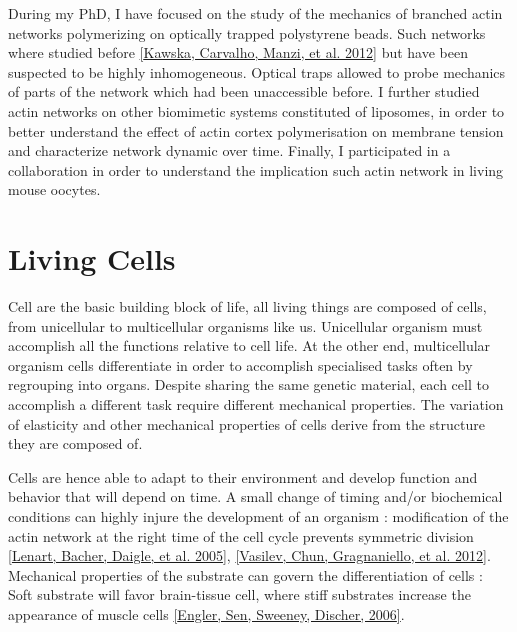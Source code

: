\documentclass[A4paperpaper,11pt,english]{sphinxmanual}
\begin{document}
During my PhD,  I have focused on the study of the mechanics of branched actin
networks polymerizing on optically trapped polystyrene beads. Such networks where
studied before {\hyperref[parts/part1:kawska2012]{{[}Kawska, Carvalho, Manzi,  et al.  2012{]}}} but have been suspected to be highly
inhomogeneous. Optical traps allowed to probe mechanics of parts of
the network which had been  unaccessible before.
I further studied actin
networks on other biomimetic systems constituted of liposomes, in order to better
understand the effect of actin cortex polymerisation on membrane tension and
characterize network dynamic over time. Finally,  I participated in a
collaboration in order to understand the implication such actin network in
living mouse oocytes.


\section{Living Cells}
\label{parts/part1:living-cells}
Cell are the basic building block of life, all living things are composed of
cells, from unicellular to multicellular organisms like us. Unicellular
organism must accomplish all the functions relative to cell life. At the other end,
multicellular organism cells differentiate in order to accomplish specialised
tasks often by regrouping into organs. Despite sharing the same genetic
material, each cell to accomplish a different task require different
mechanical properties. The variation of elasticity and other
mechanical properties of cells derive from the structure they are composed of.

Cells are hence able to adapt to their environment and develop function and
behavior that will depend on time. A small change of timing and/or biochemical
conditions can highly injure the development of an organism : modification of
the actin network at the right time of the cell cycle prevents symmetric division
{\hyperref[parts/part1:lenart2005]{{[}Lenart, Bacher, Daigle,  et al.  2005{]}}}, {\hyperref[parts/part1:vasilev2012]{{[}Vasilev, Chun, Gragnaniello,  et al.  2012{]}}}. Mechanical properties of the substrate can
govern the differentiation of cells : Soft substrate will favor brain-tissue
cell, where stiff substrates increase the appearance of muscle cells
{\hyperref[parts/part1:engler2006]{{[}Engler, Sen, Sweeney, Discher,  2006{]}}}.
\end{document}

